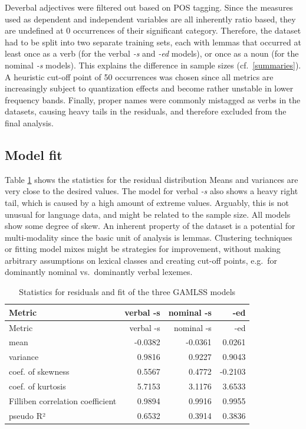 \documentclass[
]{article}
\begin{document}
Deverbal adjectives were filtered out based on POS tagging. Since the
measures used as dependent and independent variables are all inherently
ratio based, they are undefined at 0 occurrences of their significant
category. Therefore, the dataset had to be split into two separate
training sets, each with lemmas that occurred at least once as a verb
(for the verbal \emph{-s} and \emph{-ed} models), or once as a noun (for
the nominal \emph{-s} models). This explains the difference in sample
sizes (cf.~\ref{summaries}). A heuristic cut-off point of 50 occurrences
was chosen since all metrics are increasingly subject to quantization
effects and become rather unstable in lower frequency bands. Finally,
proper names were commonly mistagged as verbs in the datasets, causing
heavy tails in the residuals, and therefore excluded from the final
analysis.

\hypertarget{model-fit}{%
\subsection{Model fit}\label{model-fit}}

Table \ref{fit} shows the statistics for the residual distribution Means
and variances are very close to the desired values. The model for verbal
\emph{-s} also shows a heavy right tail, which is caused by a high
amount of extreme values. Arguably, this is not unusual for language
data, and might be related to the sample size. All models show some
degree of skew. An inherent property of the dataset is a potential for
multi-modality since the basic unit of analysis is lemmas. Clustering
techniques or fitting model mixes might be strategies for improvement,
without making arbitrary assumptions on lexical classes and creating
cut-off points, e.g.~for dominantly nominal vs.~dominantly verbal
lexemes.

\begin{longtable}[]{@{}lrrr@{}}
\caption{\label{fit}Statistics for residuals and fit of the three GAMLSS
models}\tabularnewline
\toprule
Metric & verbal -s & nominal -s & -ed \\
\midrule
\endfirsthead
\toprule
Metric & verbal -s & nominal -s & -ed \\
\midrule
\endhead
mean & -0.0382 & -0.0361 & 0.0261 \\
variance & 0.9816 & 0.9227 & 0.9043 \\
coef. of skewness & 0.5567 & 0.4772 & -0.2103 \\
coef. of kurtosis & 5.7153 & 3.1176 & 3.6533 \\
Filliben correlation coefficient & 0.9894 & 0.9916 & 0.9955 \\
pseudo R² & 0.6532 & 0.3914 & 0.3836 \\
\bottomrule
\end{longtable}
\end{document}
